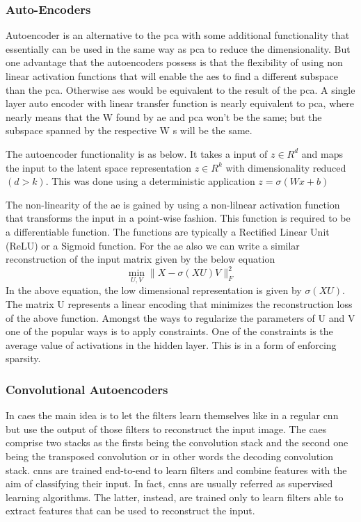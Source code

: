 \documentclass[a4paper,12pt]{report}
\begin{document}
\begin{itemize}

\subsubsection{Auto-Encoders}

Autoencoder is an alternative to the \gls{pca} with some additional functionality that essentially can be used in the same way as \gls{pca} to reduce the dimensionality. But one advantage that the autoencoders possess is that the flexibility of using non linear activation functions that will enable the \gls{ae}s to find a different subspace than the \gls{pca}. Otherwise \gls{ae}s would be equivalent to the result of the \gls{pca}. A single layer auto encoder with linear transfer function is nearly equivalent to \gls{pca}, where nearly means that the W found by \gls{ae} and \gls{pca} won't be the same; but the subspace spanned by the respective W s will be the same.  


The autoencoder functionality is as below. It takes a input of  $z \in R^d$ and maps the input to the latent space representation $z \in R^k$ with dimensionality reduced $(d > k)$.
This was done using a deterministic application $z= \sigma(Wx+b)$

The non-linearity of the \gls{ae} is gained by using a non-lilnear activation function that transforms the input in a point-wise fashion. This function is required to be a differentiable function. The functions are typically a Rectified Linear Unit (ReLU) or a Sigmoid function. For the \gls{ae} also we can write a similar reconstruction of the input matrix given by the below equation
\begin{equation}
    \min _ { U , V } \| X - \sigma ( X U ) V \| _ { F } ^ { 2 }
\end{equation}
In the above equation, the low dimensional representation is given by $\sigma(XU)$. The matrix U represents a linear encoding that minimizes the reconstruction loss of the above function. Amongst the ways to regularize the parameters of U and V one of the popular ways is to apply constraints. One of the constraints is the average value of activations in the hidden layer. This is in a form of enforcing sparsity.

\subsubsection{Convolutional Autoencoders}

In \gls{cae}s the main idea is to let the filters learn themselves like in a regular \gls{cnn} but use the output of those filters to reconstruct the input image. The \gls{cae}s comprise two stacks as the firsts being the convolution stack and the second one being the transposed convolution or in other words the decoding convolution stack. \gls{cnn}s are trained end-to-end to learn filters and combine features with the aim of classifying their input. In fact, \gls{cnn}s are usually referred as supervised learning algorithms. The latter, instead, are trained only to learn filters able to extract features that can be used to reconstruct the input.


\end{itemize}
\end{document}
